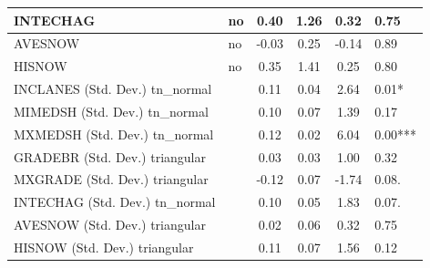 \begin{table}
\begin{center}
\begin{tabular}{|l|l|c|c|c|l|}
			\hline
			INTECHAG & no & 0.40 & 1.26 & 0.32 & 0.75 \\
			\hline
			AVESNOW & no & -0.03 & 0.25 & -0.14 & 0.89 \\
			\hline
			HISNOW & no & 0.35 & 1.41 & 0.25 & 0.80 \\
			\hline
			INCLANES (Std. Dev.) tn_normal &  & 0.11 & 0.04 & 2.64 & 0.01* \\
			\hline
			MIMEDSH (Std. Dev.) tn_normal &  & 0.10 & 0.07 & 1.39 & 0.17 \\
			\hline
			MXMEDSH (Std. Dev.) tn_normal &  & 0.12 & 0.02 & 6.04 & 0.00*** \\
			\hline
			GRADEBR (Std. Dev.) triangular &  & 0.03 & 0.03 & 1.00 & 0.32 \\
			\hline
			MXGRADE (Std. Dev.) triangular &  & -0.12 & 0.07 & -1.74 & 0.08. \\
			\hline
			INTECHAG (Std. Dev.) tn_normal &  & 0.10 & 0.05 & 1.83 & 0.07. \\
			\hline
			AVESNOW (Std. Dev.) triangular &  & 0.02 & 0.06 & 0.32 & 0.75 \\
			\hline
			HISNOW (Std. Dev.) triangular &  & 0.11 & 0.07 & 1.56 & 0.12 \\
			\hline
		\end{tabular}
	\end{center}
\end{table}